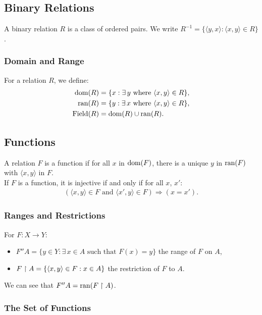 \subsection{Binary Relations}

A binary relation $R$ is a class of ordered pairs.
We write $R^{-1} = \{\langle y, x \rangle : \langle x, y \rangle \in R\}$.

\subsubsection{Domain and Range}

For a relation $R$, we define: \begin{align*}
    \operatorname{dom}(R) &= \{x : \exists \, y \text{ where } \langle x, y \rangle \in R\}, \\
    \operatorname{ran}(R) &= \{y : \exists \, x \text{ where } \langle x, y \rangle \in R\}, \\
    \operatorname{Field}(R) &= \operatorname{dom}(R) \cup \operatorname{ran}(R).
\end{align*}

\subsection{Functions}

A relation $F$ is a function if for all $x$ in $\operatorname{dom}(F)$, there is a unique
$y$ in $\operatorname{ran}(F)$ with $\langle x, y \rangle$ in $F$.
\\[\baselineskip]
If $F$ is a function, it is injective if and only if for all $x$, $x'$:
\begin{align*}
    (\langle x, y \rangle \in F \text{ and } \langle x', y \rangle \in F) 
    \Rightarrow
    (x = x').
\end{align*} 

\subsubsection{Ranges and Restrictions}

For $F : X \to Y$: \begin{itemize}
    \item $F''A = \{y \in Y : \exists \, x \in A \text{ such that } F(x) = y\}$
        the range of $F$ on $A$,
    \item $F \upharpoonright A = \{\langle x, y \rangle \in F : x \in A\}$
        the restriction of $F$ to $A$.
\end{itemize} We can see that $F''A = \operatorname{ran}(F \upharpoonright A)$.

\subsubsection{The Set of Functions}

